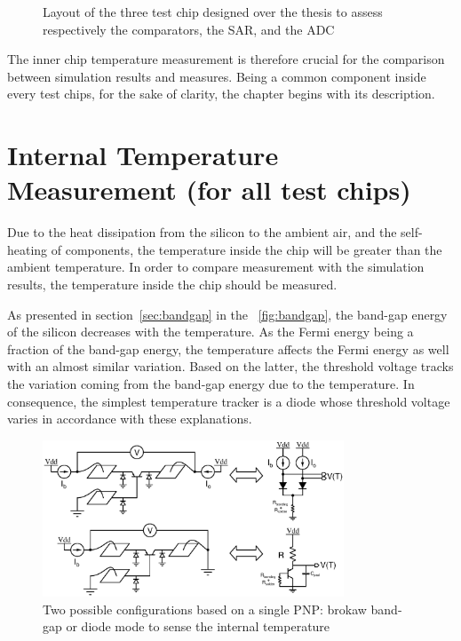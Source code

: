 \begin{figure}[htp]
\begin{subfigure}[b]{0.33\textwidth}
    \end{subfigure}
    \caption{Layout of the three test chip designed over the thesis to assess respectively the comparators, the SAR, and the ADC}
    \label{fig:testchips-layout}
\end{figure}


The inner chip temperature measurement is therefore crucial for the comparison between simulation results and measures. Being a common component inside every test chips, for the sake of clarity, the chapter begins with its description.

\section{Internal Temperature Measurement (for all test chips)}
Due to the heat dissipation from the silicon to the ambient air, and the self-heating of components, the temperature inside the chip will be greater than the ambient temperature. In order to compare measurement with the simulation results, the temperature inside the chip should be measured.

As presented in section~\ref{sec:bandgap} in the \figurename~\ref{fig:bandgap}, the band-gap energy of the silicon decreases with the temperature. As the Fermi energy being a fraction of the band-gap energy, the temperature affects the Fermi energy as well with an almost similar variation. Based on the latter, the threshold voltage tracks the variation coming from the band-gap energy due to the temperature. In consequence, the simplest temperature tracker is a diode whose threshold voltage varies in accordance with these explanations.

\begin{figure}[htp]
    \centering
    \includegraphics[width=0.8\textwidth]{Chapter5/Figs/temp_test/temperature_sensor_configuration.ps}
    \caption{Two possible configurations based on a single PNP\@: brokaw band-gap or diode mode to sense the internal temperature}
    \label{fig:temp_sensor_bipolar}
\end{figure}

